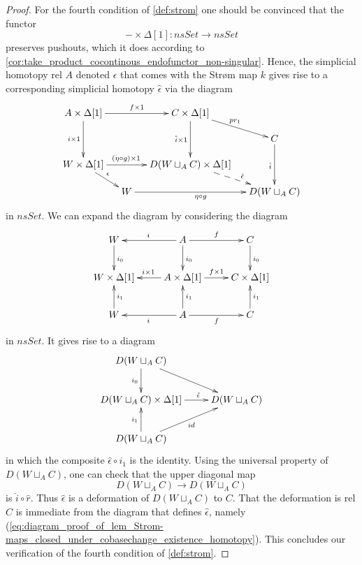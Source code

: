 \begin{proof}
For the fourth condition of \cref{def:strom} one should be convinced that the functor
\[-\times \Delta [1]:nsSet\to nsSet\]
preserves pushouts, which it does according to \cref{cor:take_product_cocontinous_endofunctor_non-singular}. Hence, the simplicial homotopy rel $A$ denoted $\epsilon$ that comes with the Str\o m map $k$ gives rise to a corresponding simplicial homotopy $\hat{\epsilon }$ via the diagram
\begin{equation}
\label{eq:diagram_proof_of_lem_Strom-maps_closed_under_cobasechange_existence_homotopy}
\begin{gathered}
\xymatrix@C-1pc@R-1pc{ %
  A\times \Delta [1] \ar[rr]^{f\times 1} \ar[dd]_{i\times 1} && C\times \Delta [1] \ar[dd]_{\hat{i} \times 1} \ar[dr]^{pr_1} \\
  &&& C \ar[dd]_{\hat{i}} \\
  W\times \Delta [1] \ar[rr]^(.4){(\eta \circ g)\times 1} \ar[dr]^\epsilon && D(W\sqcup _AC)\times \Delta [1] \ar@{-->}[dr]^(.6){\hat{\epsilon } } \\
  & W \ar[rr]_{\eta \circ g} && D(W\sqcup _AC)
}
\end{gathered}
\end{equation}
in $nsSet$. We can expand the diagram by considering the diagram
\begin{displaymath}
\xymatrix{
W \ar[d]^{i_0} & A \ar[l]_i \ar[d]^{i_0} \ar[r]^f & C \ar[d]^{i_0} \\
W\times \Delta [1] & A\times \Delta [1] \ar[l]_{i\times 1} \ar[r]^{f\times 1} & C\times \Delta [1] \\
W \ar[u]_{i_1} & A \ar[l]^i \ar[u]_{i_1} \ar[r]_f & C \ar[u]_{i_1}
}
\end{displaymath}
in $nsSet$. It gives rise to a diagram
\begin{displaymath}
\xymatrix{
D(W\sqcup _AC) \ar[d]_{i_0} \ar[dr] \\
D(W\sqcup _AC)\times \Delta [1] \ar[r]^(.6){\hat{\epsilon } } & D(W\sqcup _AC) \\
D(W\sqcup _AC) \ar[u]^{i_1} \ar[ur]_{id}
}
\end{displaymath}
in which the composite $\hat{\epsilon } \circ i_1$ is the identity. Using the universal property of $D(W\sqcup _AC)$, one can check that the upper diagonal map
\[D(W\sqcup _AC)\to D(W\sqcup _AC)\]
is $\hat{i} \circ \hat{r}$. Thus $\hat{\epsilon }$ is a deformation of $D(W\sqcup _AC)$ to $C$. That the deformation is rel $C$ is immediate from the diagram that defines $\hat{\epsilon }$, namely (\ref{eq:diagram_proof_of_lem_Strom-maps_closed_under_cobasechange_existence_homotopy}). This concludes our verification of the fourth condition of \cref{def:strom}.


\end{proof}
